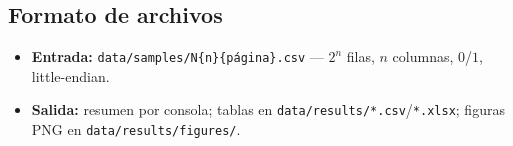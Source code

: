 \documentclass[11pt,letterpaper]{article}
\begin{document}
\subsection{Formato de archivos}
\begin{itemize}
	\item \textbf{Entrada:} \texttt{data/samples/N\{n\}\{página\}.csv} — $2^n$ filas,
	      $n$ columnas, $0$/$1$, little-endian.
	\item \textbf{Salida:} resumen por consola; tablas en
	      \texttt{data/results/*.csv}/\texttt{*.xlsx}; figuras PNG en
	      \texttt{data/results/figures/}.
\end{itemize}
\end{document}
